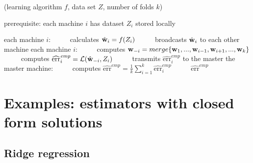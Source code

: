 \documentclass[thesis.tex]{subfiles}
\newcommand{\set}[1]{\mathcal {#1}}
\newcommand{\mappend}[1]{\oplus_{\set {#1}}}
\newcommand{\riskemp}{\widehat{\textrm{err}}^\textit{emp}}
\newcommand{\distcv}{\mkprocedure{dist\_cv}}
\begin{document}
\begin{algorithm}[t]
    \caption{\distcv(learning algorithm $f$, data set $Z$, number of folds $k$)}
    \vspace{0.1in}
    prerequisite: each machine $i$ has dataset $Z_i$ stored locally
    \begin{algorithmic}[1]
        \State each machine $i$:
        \State ~~~~~calculates ${\hat{\mathbf w}}_i = f(Z_i)$
        \State ~~~~~broadcasts ${\hat{\mathbf w}}_i$ to each other machine
        \State each machine $i$:
        \State ~~~~~computes $\mathbf w_{-i} = merge\{\mathbf w_1,...,\mathbf w_{i-1},\mathbf w_{i+1},...,\mathbf w_k\}$
        \State ~~~~~computes $\riskemp_i = \Loss(\what_{-i},Z_i)$
        \State ~~~~~transmits $\riskemp_i$ to the master
        \State the master machine:
        \State ~~~~~computes $\riskemp = \frac 1 k \sum_{i=1}^k \riskemp_i$
        \State ~~~~~\Return $\riskemp$
    \end{algorithmic}
\end{algorithm}


%


\section{Examples: estimators with closed form solutions}


\subsection{Ridge regression}
\label{sec:ridge}

\end{document}
